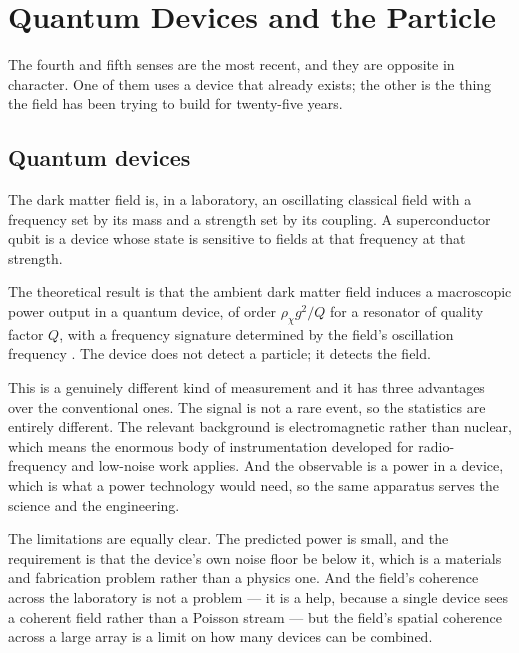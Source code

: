
\chapter{Quantum Devices and the Particle}
\label{ch:quantum}

The fourth and fifth senses are the most recent, and they are opposite in
character. One of them uses a device that already exists; the other is the
thing the field has been trying to build for twenty-five years.

\section{Quantum devices}The dark matter field is, in a laboratory, an
oscillating classical field with a frequency set by its mass and a strength
set by its coupling. A superconductor qubit is a device whose state is
sensitive to fields at that frequency at that strength.

The theoretical result is that the ambient dark matter field induces a
macroscopic power output in a quantum device, of order
$\rho_\chi g^2/Q$ for a resonator of quality factor $Q$, with a frequency
signature determined by the field's oscillation frequency
. The device does not detect a particle; it
detects the field.

This is a genuinely different kind of measurement and it has three
advantages over the conventional ones. The signal is not a rare event, so
the statistics are entirely different. The relevant background is
electromagnetic rather than nuclear, which means the enormous body of
instrumentation developed for radio-frequency and low-noise work applies.
And the observable is a power in a device, which is what a power technology
would need, so the same apparatus serves the science and the engineering.

The limitations are equally clear. The predicted power is small, and the
requirement is that the device's own noise floor be below it, which is a
materials and fabrication problem rather than a physics one. And the
field's coherence across the laboratory is not a problem --- it is a help,
because a single device sees a coherent field rather than a Poisson stream
--- but the field's spatial coherence across a large array is a limit on
how many devices can be combined.

